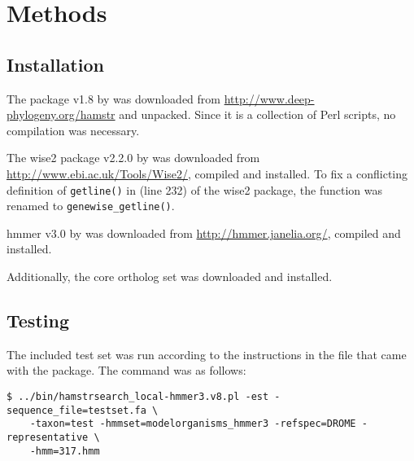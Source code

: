 \section{Methods}

\subsection{Installation}

The \hamstr package v1.8 by \cite{Ebersberger2009} was downloaded from \url{http://www.deep-phylogeny.org/hamstr} and unpacked. Since it is a collection of Perl scripts, no compilation was necessary.

The wise2 package v2.2.0 by \cite{Birney2004} was downloaded from \url{http://www.ebi.ac.uk/Tools/Wise2/}, compiled and installed. To fix a conflicting definition of \lstinline{getline()} in  (line 232) of the wise2 package, the function was renamed to \lstinline{genewise_getline()}. 

hmmer v3.0 by \cite{Eddy2009} was downloaded from \url{http://hmmer.janelia.org/}, compiled and installed.

Additionally, the  core ortholog set was downloaded and installed.

\subsection{Testing}

The included test set was run according to the instructions in the  file that came with the \hamstr package. The command was as follows:

\begin{verbatim}
$ ../bin/hamstrsearch_local-hmmer3.v8.pl -est -sequence_file=testset.fa \
	-taxon=test -hmmset=modelorganisms_hmmer3 -refspec=DROME -representative \
	-hmm=317.hmm
\end{verbatim}

